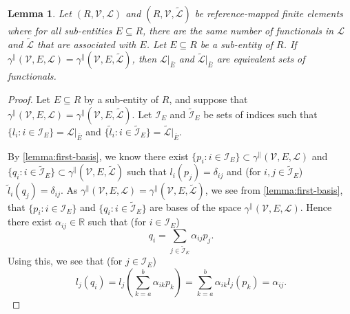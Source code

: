 \documentclass[sn-mathphys-num]{sn-jnl}%
\theoremstyle{thmstyleone}%
\newtheorem{lemma}{Lemma}%
\newcommand{\closure}[1]{\overline{#1}}
\newcommand{\subentity}{E}
\newcommand{\refel}{R}
\newcommand{\polyspace}{\mathcal{V}}
\newcommand{\dualbasis}{\mathcal{L}}
\newcommand{\ctrace}[3]{\gamma^\parallel(#1,#2,#3)}
\theoremstyle{thmstyletwo}%
\theoremstyle{thmstylethree}%
\begin{document}
\begin{lemma}\label{lemma:fourth}
Let $(\refel,\polyspace,\dualbasis)$ and $(\refel,\polyspace,\tilde{\dualbasis})$ be reference-mapped finite elements
where for all sub-entities $\subentity\subseteq\refel$, there are the same number of functionals in $\dualbasis$ and $\tilde{\dualbasis}$ that are associated with $\subentity$.
Let $\subentity\subseteq\refel$ be a sub-entity of $\refel$.
If
$\ctrace{\polyspace}{\subentity}{\dualbasis} = \ctrace{\polyspace}{\subentity}{\tilde{\dualbasis}}$,
then 
$\left.\dualbasis\right|_{\closure{\subentity}}$ and $\tilde{\dualbasis}|_{\closure{\subentity}}$
are equivalent sets of functionals.
\end{lemma}
\begin{proof}
Let $\subentity\subseteq\refel$ by a sub-entity of $\refel$, and suppose that
$\ctrace{\polyspace}{\subentity}{\dualbasis} = \ctrace{\polyspace}{\subentity}{\tilde{\dualbasis}}$.
Let $\mathcal{I}_{\subentity}$ and $\widetilde{\mathcal{I}}_{\subentity}$ be sets of indices such that
$\{l_i:i\in\mathcal{I}_{\subentity}\}=\dualbasis|_{\closure{\subentity}}$ and
$\{\tilde{l}_i:i\in\widetilde{\mathcal{I}}_{\subentity}\}=\tilde{\dualbasis}|_{\closure{\subentity}}$.

By \cref{lemma:first-basis}, we know there exist
$\{p_i:i\in\mathcal{I}_{\subentity}\}\subset\ctrace{\polyspace}{\subentity}{\dualbasis}$
and
$\{q_i:i\in\widetilde{\mathcal{I}}_{\subentity}\}\subset\ctrace{\polyspace}{\subentity}{\tilde{\dualbasis}}$
such that $l_i(p_j)=\delta_{ij}$ and
(for $i,j\in\widetilde{\mathcal{I}}_{\subentity}$)
$\tilde{l}_i(q_j)=\delta_{ij}$.
As $\ctrace{\polyspace}{\subentity}{\dualbasis} = \ctrace{\polyspace}{\subentity}{\tilde{\dualbasis}}$, we see from 
\cref{lemma:first-basis}, 
that 
$\{p_i:i\in\mathcal{I}_{\subentity}\}$ and $\{q_i:i\in\widetilde{\mathcal{I}}_{\subentity}\}$ are bases of
the space $\ctrace{\polyspace}{\subentity}{\dualbasis}$. Hence
there exist $\alpha_{ij}\in\mathbb{R}$ such that
(for $i\in\mathcal{I}_{\subentity}$)
\[
q_i = \sum_{j\in\widetilde{\mathcal{I}}_{\subentity}} \alpha_{ij}p_j.
\]
Using this, we see that (for $j\in\mathcal{I}_{\subentity}$)
\begin{equation}\label{eq:l_j(q_i)}
l_j\left(q_i\right)
=
l_j\left(\sum_{k=a}^b \alpha_{ik}p_k\right)
=
\sum_{k=a}^b \alpha_{ik}l_j\left(p_k\right)
=
\alpha_{ij}.
\end{equation}


\end{proof}
\end{document}
